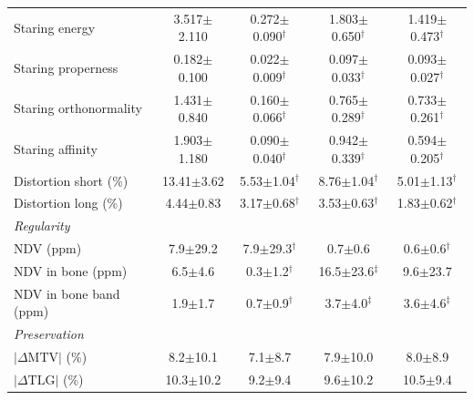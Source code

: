 \begin{table}[t]
{\begin{tabular}{lcccc}
Staring energy & 3.517$\pm$2.110 & 0.272$\pm$0.090$^{\dagger}$ & 1.803$\pm$0.650$^{\dagger}$ & 1.419$\pm$0.473$^{\dagger}$ \\
Staring properness & 0.182$\pm$0.100 & 0.022$\pm$0.009$^{\dagger}$ & 0.097$\pm$0.033$^{\dagger}$ & 0.093$\pm$0.027$^{\dagger}$ \\
Staring orthonormality & 1.431$\pm$0.840 & 0.160$\pm$0.066$^{\dagger}$ & 0.765$\pm$0.289$^{\dagger}$ & 0.733$\pm$0.261$^{\dagger}$ \\
Staring affinity & 1.903$\pm$1.180 & 0.090$\pm$0.040$^{\dagger}$ & 0.942$\pm$0.339$^{\dagger}$ & 0.594$\pm$0.205$^{\dagger}$ \\
Distortion short (\%) & 13.41$\pm$3.62 & 5.53$\pm$1.04$^{\dagger}$ & 8.76$\pm$1.04$^{\dagger}$ & 5.01$\pm$1.13$^{\dagger}$ \\
Distortion long (\%) & 4.44$\pm$0.83 & 3.17$\pm$0.68$^{\dagger}$ & 3.53$\pm$0.63$^{\dagger}$ & 1.83$\pm$0.62$^{\dagger}$ \\
\multicolumn{5}{l}{\textit{Regularity}} \\
NDV (ppm) & 7.9$\pm$29.2 & 7.9$\pm$29.3$^{\dagger}$ & 0.7$\pm$0.6 & 0.6$\pm$0.6$^{\dagger}$ \\
NDV in bone (ppm) & 6.5$\pm$4.6 & 0.3$\pm$1.2$^{\dagger}$ & 16.5$\pm$23.6$^{\ddagger}$ & 9.6$\pm$23.7 \\
NDV in bone band (ppm) & 1.9$\pm$1.7 & 0.7$\pm$0.9$^{\dagger}$ & 3.7$\pm$4.0$^{\ddagger}$ & 3.6$\pm$4.6$^{\ddagger}$ \\
\multicolumn{5}{l}{\textit{Preservation}} \\
$|\Delta\mathrm{MTV}|$ (\%) & 8.2$\pm$10.1 & 7.1$\pm$8.7 & 7.9$\pm$10.0 & 8.0$\pm$8.9 \\
$|\Delta\mathrm{TLG}|$ (\%) & 10.3$\pm$10.2 & 9.2$\pm$9.4 & 9.6$\pm$10.2 & 10.5$\pm$9.4 \\
\bottomrule
\end{tabular}}
\end{table}
